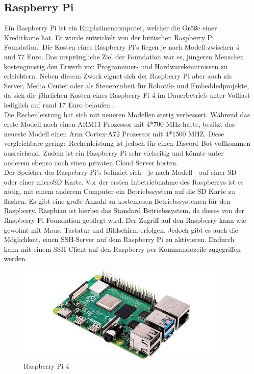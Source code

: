 \documentclass[sigplan,screen]{acmart}
\begin{document}
\subsection{Raspberry Pi}
Ein Raspberry Pi ist ein Einplatinencomputer, welcher die Größe einer Kreditkarte hat. Er wurde entwickelt von der britischen Raspberry Pi Foundation. Die Kosten eines Raspberry Pi's liegen je nach Modell zwischen 4 und 77 Euro. \cite{berry} Das ursprüngliche Ziel der Foundation war es, jüngeren Menschen kostengünstig den Erwerb von Programmier- und Hardwarekenntnissen zu erleichtern. Neben diesem Zweck eignet sich der Raspberry Pi aber auch als Server, Media Center oder als Steuereinheit für Robotik- und Embeddedprojekte, da sich die jährlichen Kosten eines Raspberry Pi 4 im Dauerbetrieb unter Volllast lediglich auf rund 17 Euro belaufen \cite{stropi}. \\
\noindent Die Rechenleistung hat sich mit neueren Modellen stetig verbessert. Während das erste Modell noch einen ARM11 Prozessor mit 4*700 MHz hatte, besitzt das neueste Modell einen Arm Cortex-A72 Prozessor mit 4*1500 MHZ\cite{rasbi0}. Diese vergleichbare geringe Rechenleistung ist jedoch für einen Discord Bot vollkommen ausreichend. Zudem ist ein Raspberry Pi sehr vielseitig und könnte unter anderem ebenso noch einen privaten Cloud Server hosten. \\
\noindent Der Speicher des Raspebrry Pi's befindet sich - je nach Modell - auf einer SD- oder einer microSD Karte. Vor der ersten Inbetriebnahme des Raspberrys ist es nötig, mit einem anderem Computer ein Betriebssystem auf die SD Karte zu flashen. \cite{rasbi2} Es gibt eine große Anzahl an kostenlosen Betriebssystemen für den Raspberry. Raspbian ist hierbei das Standard Betriebssystem, da dieses von der Raspberry Pi Foundation gepflegt wird. \cite{rasbi4} Der Zugriff auf den Raspberry kann wie gewohnt mit Maus, Tastatur und Bildschirm erfolgen. Jedoch gibt es auch die Möglichkeit, einen SSH-Server auf dem Raspberry Pi zu aktivieren. Dadurch kann mit einem SSH Client auf den Raspberry per Kommandozeile zugegriffen werden. \cite{rasbi3}


\begin{figure}[h]
  \centering
  \includegraphics[width=\linewidth]{raspberry}
  \caption{Raspberry Pi 4 \cite{rasbi1}}
\end{figure}
\end{document}
